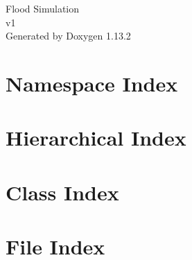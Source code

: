 \documentclass[twoside]{book}
\newcommand{\+}{\discretionary{\mbox{\scriptsize$\hookleftarrow$}}{}{}}
\newcommand{\clearemptydoublepage}{%
    \newpage{\pagestyle{empty}\cleardoublepage}%
  }
\begin{document}
  \raggedbottom
    \hypersetup{pageanchor=false,
                bookmarksnumbered=true,
                pdfencoding=unicode
               }
  \begin{titlepage}
  \vspace*{7cm}
  \begin{center}%
  {\Large Flood Simulation}\\
  [1ex]\large v1 \\
  \vspace*{1cm}
  {\large Generated by Doxygen 1.13.2}\\
  \end{center}
  \end{titlepage}
  \clearemptydoublepage
  \tableofcontents
  \clearemptydoublepage
  \hypersetup{pageanchor=true}


\chapter{Namespace Index}

\chapter{Hierarchical Index}

\chapter{Class Index}

\chapter{File Index}

\end{document}
